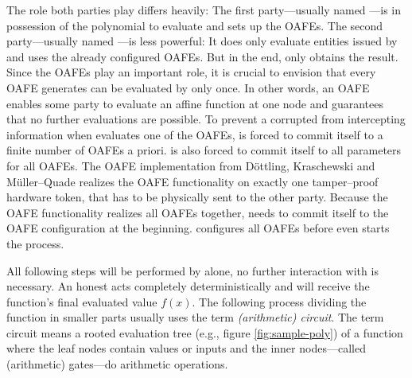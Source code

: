 The role both parties play differs heavily: The first party---usually named
\JWpOne{}---is in possession of the polynomial to evaluate and sets up the
OAFEs.  The second party---usually named \JWpTwo{}---is less powerful: It does
only evaluate entities issued by \JWpOne{} and uses the already configured
OAFEs. But in the end, only \JWpTwo{} obtains the result.  Since the OAFEs play
an important role, it is crucial to envision that every OAFE \JWpOne{} generates
can be evaluated by \JWpTwo{} only once. In other words, an OAFE enables some
party to evaluate an affine function at one node and guarantees that no further
evaluations are possible. To prevent a corrupted \JWpOne{} from intercepting
information when \JWpTwo{} evaluates one of the OAFEs, \JWpOne{} is forced to
commit itself to a finite number of OAFEs a priori. \JWpOne{} is also forced to
commit itself to all parameters for all OAFEs. The OAFE implementation from
Döttling, Kraschewski and Müller--Quade\cite{davidgoliath} realizes the OAFE
functionality on exactly one tamper--proof hardware token, that has to be
physically sent to the other party. Because the OAFE functionality realizes all
OAFEs together, \JWpOne{} needs to commit itself to the OAFE configuration at
the beginning. \JWpOne{} configures all OAFEs before \JWpTwo{} even starts the
process.

All following steps will be performed by \JWpTwo{} alone, no further interaction
with \JWpOne{} is necessary. An honest \JWpTwo{} acts completely
deterministically and will receive the function's final evaluated value $f(x)$.
The following process dividing the function in smaller parts usually uses the
term \emph{(arithmetic) circuit}. The term circuit means a rooted evaluation
tree (e.g., figure \ref{fig:sample-poly}) of a function where the leaf nodes
contain values or inputs and the inner nodes---called (arithmetic) gates---do
arithmetic operations.

